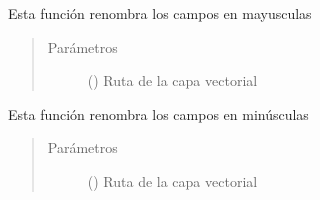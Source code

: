 \documentclass[letterpaper,10pt,spanish]{sphinxmanual}
\begin{document}
\begin{fulllineitems}
\label{\detokenize{apcsig:apcsig.campos_mayusculas}}
Esta función renombra los campos en mayusculas
\begin{quote}\begin{description}
\item[{Parámetros}] \leavevmode
{} () \textendash{} Ruta de la capa vectorial

\end{description}\end{quote}

\end{fulllineitems}


\begin{fulllineitems}
\label{\detokenize{apcsig:apcsig.campos_minusculas}}
Esta función renombra los campos en minúsculas
\begin{quote}\begin{description}
\item[{Parámetros}] \leavevmode
{} () \textendash{} Ruta de la capa vectorial

\end{description}\end{quote}

\end{fulllineitems}

\end{document}
